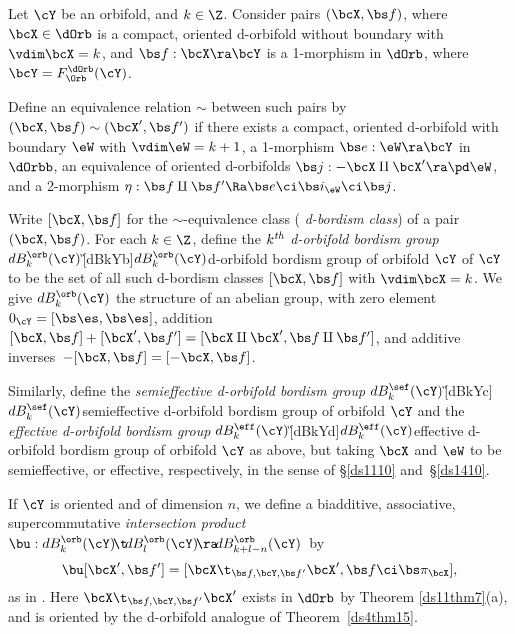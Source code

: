 \documentclass{article}
\begin{document}
\begin{dfn} Let $\cY$ be an orbifold, and $k\in\Z$. Consider
pairs $(\bcX,\bs f)$, where $\bcX\in\dOrb$ is a compact, oriented
d-orbifold without boundary with $\vdim\bcX=k$, and $\bs
f:\bcX\ra\bcY$ is a 1-morphism in $\dOrb$,
where~$\bcY=F_\Orb^\dOrb(\cY)$.

Define an equivalence relation $\sim$ between such pairs by
$(\bcX,\bs f) \sim(\bcX',\bs f')$ if there exists a compact,
oriented d-orbifold with boundary $\eW$
with $\vdim\eW=k+1$, a 1-morphism $\bs e:\eW\ra\bcY$ in $\dOrbb$, an
equivalence of oriented d-orbifolds $\bs
j:-\bcX\amalg\bcX'\ra\pd\eW$, and a 2-morphism $\eta:\bs f\amalg\bs
f'\Ra\bs e\ci\bs i_\eW\ci \bs j$.

Write $[\bcX,\bs f]$ for the $\sim$-equivalence class ({\it
d-bordism class\/}) of a pair $(\bcX,\bs f)$. For each $k\in\Z$,
define the $k^{\it th}$ {\it d-orbifold bordism group\/}
$dB_k^\orb(\cY)$\G[dBkYb]{$dB_k^\orb(\cY)$}{d-orbifold bordism group
of orbifold $\cY$} of $\cY$ to be the set of all such d-bordism
classes $[\bcX,\bs f]$ with $\vdim\bcX=k$. We give $dB_k^\orb(\cY)$
the structure of an abelian group, with zero element
$0_\cY=[\bs\es,\bs\es]$, addition $[\bcX,\bs f]+[\bcX',\bs
f']=[\bcX\amalg\bcX',\bs f\amalg\bs f']$, and additive
inverses~$-[\bcX,\bs f]=[-\bcX,\bs f]$.

Similarly, define the {\it semieffective d-orbifold bordism
group\/}
$dB_k^\sef(\cY)$\G[dBkYc]{$dB_k^\sef(\cY)$}{semieffective d-orbifold
bordism group of orbifold $\cY$} and the {\it effective d-orbifold
bordism
group\/}
$dB_k^\eff(\cY)$\G[dBkYd]{$dB_k^\eff(\cY)$}{effective d-orbifold
bordism group of orbifold $\cY$} as above, but taking $\bcX$ and
$\eW$ to be semieffective, or effective, respectively, in the sense
of \S\ref{ds1110} and~\S\ref{ds1410}.

If $\cY$ is oriented and of dimension $n$, we define a biadditive,
associative, supercommutative {\it intersection
product\/}
$\bu:dB_k^\orb(\cY)\!\t\! dB_l^\orb(\cY)\!\ra\!
dB_{k+l-n}^\orb(\cY)$~by
\begin{equation*}
[\bcX,\bs f]\bu[\bcX',\bs f']=[\bcX\t_{\bs f,\bcY,\bs f'}\bcX',\bs
f\ci\bs\pi_\bcX],
\end{equation*}
as in . Here $\bcX\t_{\bs f,\bcY,\bs f'}\bcX'$ exists in
$\dOrb$ by Theorem \ref{ds11thm7}(a), and is oriented by the
d-orbifold analogue of Theorem~\ref{ds4thm15}.


\end{dfn}
\end{document}
